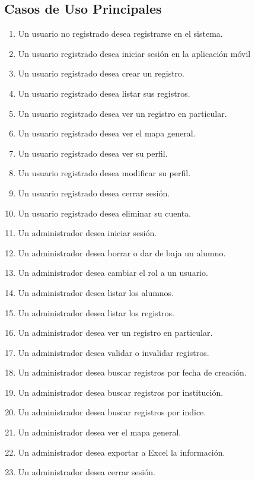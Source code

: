 		\subsection{Casos de Uso Principales}
			\begin{enumerate}[CU1:]
				\itemsep-1em
				\item Un usuario no registrado desea registrarse en el sistema.
				\item Un usuario registrado desea iniciar sesión en la aplicación móvil
				\item Un usuario registrado desea crear un registro.
				\item Un usuario registrado desea listar sus registros.
				\item Un usuario registrado desea ver un registro en particular.
				\item Un usuario registrado desea ver el mapa general.
				\item Un usuario registrado desea ver su perfil.
				\item Un usuario registrado desea modificar su perfil.
				\item Un usuario registrado desea cerrar sesión.
				\item Un usuario registrado desea eliminar su cuenta.
				\item Un administrador desea iniciar sesión.
				\item Un administrador desea borrar o dar de baja un alumno.
				\item Un administrador desea cambiar el rol a un usuario.
				\item Un administrador desea listar los alumnos.
				\item Un administrador desea listar los registros.
				\item Un administrador desea ver un registro en particular.
				\item Un administrador desea validar o invalidar registros.
				\item Un administrador desea buscar registros por fecha de creación.
				\item Un administrador desea buscar registros por institución.
				\item Un administrador desea buscar registros por indice.
				\item Un administrador desea ver el mapa general.
				\item Un administrador desea exportar a Excel la información.
				\item Un administrador desea cerrar sesión.
			\end{enumerate}


	